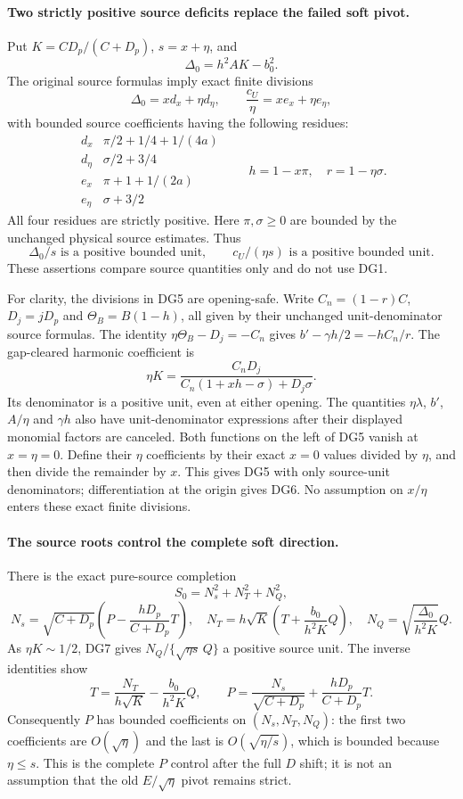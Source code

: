 \paragraph{Two strictly positive source deficits replace the failed soft pivot.}
Put $K=CD_p/(C+D_p)$, $s=x+\eta$, and
\[
                         \Delta_0=h^2AK-b_0^2.
\]
The original source formulas imply exact finite divisions
\[
 \Delta_0=x d_x+\eta d_\eta,\qquad
 \frac{c_U}{\eta}=x e_x+\eta e_\eta,                \tag{DG5}
\]
with bounded source coefficients having the following residues:
\[
 \begin{array}{c|c}
 d_x&\pi/2+1/4+1/(4a)\\
 d_\eta&\sigma/2+3/4\\
 e_x&\pi+1+1/(2a)\\
 e_\eta&\sigma+3/2
 \end{array}
 \qquad h=1-x\pi,\quad r=1-\eta\sigma.             \tag{DG6}
\]
All four residues are strictly positive. Here $\pi,\sigma\ge0$
are bounded by the unchanged physical source estimates. Thus
\[
 \Delta_0/s\text{ is a positive bounded unit},\qquad
 c_U/(\eta s)\text{ is a positive bounded unit}.     \tag{DG7}
\]
These assertions compare source quantities only and do not use DG1.

For clarity, the divisions in DG5 are opening-safe. Write
$C_n=(1-r)C$, $D_j=jD_p$ and $\Theta_B=B(1-h)$, all given by their
unchanged unit-denominator source formulas. The identity
$\eta\Theta_B-D_j=-C_n$ gives
$b'-\gamma h/2=-hC_n/r$. The gap-cleared harmonic coefficient is
\[
 \eta K=\frac{C_nD_j}
 {C_n(1+xh-\sigma)+D_j\sigma}.
\]
Its denominator is a positive unit, even at either opening. The
quantities $\eta\lambda$, $b'$, $A/\eta$ and $\gamma h$ also have
unit-denominator expressions after their displayed monomial factors
are canceled. Both functions on the left of DG5 vanish at
$x=\eta=0$. Define their $\eta$ coefficients by their exact $x=0$
values divided by $\eta$, and then divide the remainder by $x$.
This gives DG5 with only source-unit denominators; differentiation at
the origin gives DG6. No assumption on $x/\eta$ enters these exact
finite divisions.

\paragraph{The source roots control the complete soft direction.}
There is the exact pure-source completion
\[
 S_0=N_s^2+N_T^2+N_Q^2,
\]
\[
 N_s=\sqrt{C+D_p}\left(P-\frac{hD_p}{C+D_p}T\right),
 \quad N_T=h\sqrt K\left(T+\frac{b_0}{h^2K}Q\right),
 \quad N_Q=\sqrt{\frac{\Delta_0}{h^2K}}Q.            \tag{DG8}
\]
As $\eta K\sim1/2$, DG7 gives
$N_Q/\{\sqrt{\eta s}\,Q\}$ a positive source unit. The inverse
identities show
\[
 T=\frac{N_T}{h\sqrt K}-\frac{b_0}{h^2K}Q,
 \qquad
 P=\frac{N_s}{\sqrt{C+D_p}}
                      +\frac{hD_p}{C+D_p}T.         \tag{DG9}
\]
Consequently $P$ has bounded coefficients on $(N_s,N_T,N_Q)$:
the first two coefficients are $O(\sqrt\eta)$ and the last is
$O(\sqrt{\eta/s})$, which is bounded because $\eta\le s$.
This is the complete $P$ control after the full $D$ shift; it is not
an assumption that the old $E/\sqrt\eta$ pivot remains strict.

